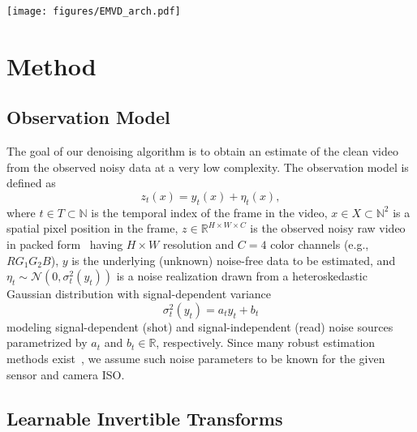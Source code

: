 \documentclass[final]{cvpr}
\begin{document}
    \begin{figure*}[ht!]
        \centering
        \texttt{[image: figures/EMVD\_arch.pdf]}
        \caption{Architecture of the proposed multi-stage video denoising EMVD. Refer to Section~\ref{section:method} for details.}
        \label{fig:architecture} 
    \end{figure*}
    
    \section{Method}
    \label{section:method}

    \subsection{Observation Model}
    
    The goal of our denoising algorithm is to obtain an estimate of the clean video from the observed noisy data at a very low complexity. The observation model is defined as
    \begin{equation}
        z_t(x) = y_t(x) + \eta_t(x),
        \label{eq:raw_noise}
    \end{equation}
    where $t \in T \subset \mathbb{N}$ is the temporal index of the frame in the video, $x \in X \subset \mathbb{N}^2$ is a spatial pixel position in the frame, $z \in \mathbb{R}^{H \times W \times C}$ is the observed noisy raw video in packed form~\cite{gharbi2016jdd} having $H \times W$ resolution and $C=4$ color channels (e.g., $RG_1G_2B$), $y$ is the underlying (unknown) noise-free data to be estimated, and $\eta_t \sim \mathcal{N}\left(0, \sigma^2_t(y_t) \right)$ is a noise realization drawn from a heteroskedastic Gaussian distribution with signal-dependent variance
    \begin{equation}
        \sigma^2_t(y_t) = a_t y_t + b_t
        \label{eq:raw_variance}
    \end{equation}
    modeling signal-dependent (shot) and signal-independent (read) noise sources parametrized by $a_t$ and $b_t \in \mathbb{R}$, respectively. Since many robust estimation methods exist~\cite{foi2008noisemodel, azzari2014noiseestimation}, we assume such noise parameters to be known for the given sensor and camera ISO.
    
    \subsection{Learnable Invertible Transforms}
    
\end{document}
